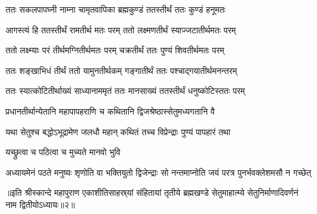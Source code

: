\twolineshloka
{ततः सकलपापघ्नी नाम्ना चामृतवापिका}
{ब्रह्मकुण्डं ततस्तीर्थं ततः कुण्डं हनूमतः}%

\twolineshloka
{आगस्त्यं हि ततस्तीर्थं रामतीर्थ मतः परम्}
{ततो लक्ष्मणतीर्थं स्याज्जटातीर्थमतः परम्}%

\twolineshloka
{ततो लक्ष्म्याः परं तीर्थमग्नितीर्थमतः परम्}
{चक्रतीर्थं ततः पुण्यं शिवतीर्थमतः परम्}%

\twolineshloka
{ततः शङ्खाभिधं तीर्थं ततो यामुनतीर्थकम्}
{गङ्गातीर्थं ततः पश्चाद्गयातीर्थमनन्तरम्}%

\twolineshloka
{ततः स्यात्कोटितीर्थाख्यं साध्यानाममृतं ततः}
{मानसाख्यं ततस्तीर्थं धनुष्कोटिस्ततः परम्}%

\twolineshloka
{प्रधानतीर्थान्येतानि महापापहराणि च}
{कथितानि द्विजश्रेष्ठास्सेतुमध्यगतानि वै}%

\twolineshloka
{यथा सेतुश्च बद्धोऽभूद्रामेण जलधौ महान्}
{कथितं तच्च विप्रेन्द्राः पुण्यं पापहारं तथा}%

\onelineshloka
{यच्छ्रुत्वा च पठित्वा च मुच्यते मानवो भुवि}%

\twolineshloka
{अध्यायमेनं पठते मनुष्यः शृणोति वा भक्तियुतो द्विजेन्द्राः}
{सो नन्तमाप्नोति जयं परत्र पुनर्भवक्लेशमसौ न गच्छेत्}%

॥इति श्रीस्कान्दे महापुराण एकाशीतिसाहस्र्यां संहितायां तृतीये ब्रह्मखण्डे सेतुमाहात्म्ये सेतुनिर्माणादिवर्णनं नाम द्वितीयोऽध्यायः॥२॥
